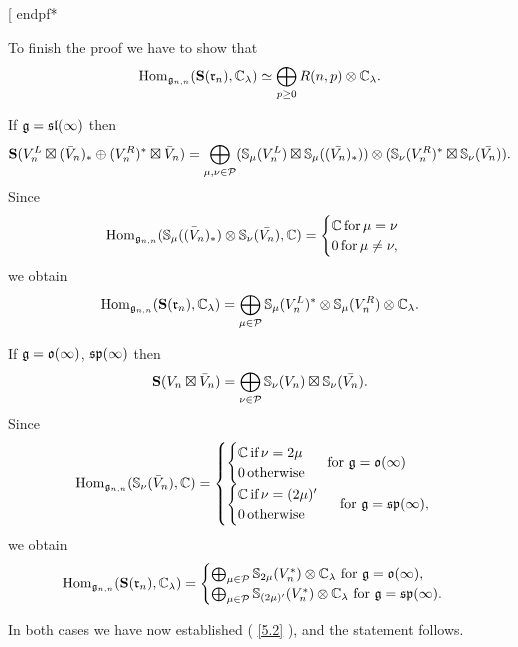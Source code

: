 \documentclass[12pt]{amsart}
\makeatletter
\def\mathbb{\Bbb}
\def\mathfrak{\frak}
\newenvironment{proof}{%
         \@ifnextchar[{%
                       \expandafter\let\expandafter\end@proof
                         \csname endpf*\endcsname
                         \my@proof
                      }{\let\end@proof\endpf\pf}%
        }{\end@proof}
\def\my@proof[#1]{\@nameuse{pf*}{#1}}
\def\mathcal{\cal}
\def\@putname#1#2#3#4{\def\@@ref{#3}\let\old@bf\bf
        \def\bf##1{\old@bf\if?\noexpand##1?{#4}\else##1\fi}%
        #1{#2}%
        \let\bf\old@bf}
\def\@putname#1#2#3#4{\def\@@ref{#3}\let\old@bf\bf    %
        \let\old@reset@font\reset@font                  %
        \def\bf##1{\old@bf\if?\noexpand##1?{#4}\else##1\fi}%
        \def\reset@font##1##2{\old@reset@font##1\if?\noexpand##2?{#4}\else##2\fi}#1{#2}%
        \let\bf\old@bf\let\reset@font\old@reset@font}
\let\my@ref=\ref
\def\ref#1{\@putname\my@ref{#1}{#1}{\tiny\rm\@@ref}}
\theoremstyle{plain} %
\numberwithin{equation}{section}
\theoremstyle{definition}
\theoremstyle{remark}
\theoremstyle{plain} %
\newcommand{\fg}{\mathfrak{g}}
\newcommand{\fr}{\mathfrak{r}}
\makeatother
\begin{document}
\begin{proof}
To finish the proof we have to show that  
\begin{equation}\label{5.2}
\operatorname{Hom}_{\fg_{n,n}}({\bf S}(\fr_n),\mathbb C_\lambda)\simeq  \bigoplus_{p\geq 0} R(n,p)\otimes\mathbb{C}_{\lambda}.\end{equation}

If $\fg=\mathfrak{sl}(\infty)$ then
$${\bf S}(V_n^L\boxtimes (\bar {V}_n)_*\oplus (V_n^R)^*\boxtimes \bar {V}_n)=\bigoplus_{\mu,\nu\in\mathcal{P}}(\mathbb{S}_\mu (V_n^L)\boxtimes\mathbb{S}_\mu((\bar {V_n})_*))\otimes(\mathbb{S}_\nu(V_n^R)^*\boxtimes \mathbb{S}_\nu(\bar {V_n})).$$
Since $$\operatorname{Hom}_{\mathfrak g_{n,n}}(\mathbb{S}_\mu(\bar {(V_n})_*)\otimes  \mathbb{S}_\nu(\bar {V_n}),\mathbb C)=\begin{cases}\mathbb C\,\text{for}\,\mu=\nu\\ 0\,\text{for}\,\mu\neq\nu,\end{cases}$$
we obtain
$$\operatorname{Hom}_{\fg_{n,n}}({\bf S}(\fr_n),\mathbb C_\lambda)=\bigoplus_{\mu \in \mathcal{P}}\mathbb{S}_\mu (V_n^L)^*\otimes \mathbb{S}_\mu(V_n^R)\otimes \mathbb C_\lambda.$$

If $\fg=\mathfrak{o}(\infty)$, $\mathfrak{sp}(\infty)$  then
$${\bf S}(V_n\boxtimes \bar {V}_n)=\bigoplus_{\nu \in \mathcal{P}}\mathbb{S}_\nu(V_n)\boxtimes \mathbb{S}_\nu(\bar {V_n}).$$
Since
$$\operatorname{Hom}_{\mathfrak g_{n,n}}(\mathbb{S}_\nu(\bar {V}_n),\mathbb C)=\begin{cases}\begin{cases}\mathbb C\,\text{if}\,\nu=2\mu\\ 0\,\text{otherwise}\end{cases}\text{ for }\fg=\mathfrak{o}(\infty)\\\begin{cases}\mathbb C\,\text{if}\,\nu=(2\mu)'\\ 0\,\text{otherwise}\end{cases}\text{ for }\fg=\mathfrak{sp}(\infty),\end{cases}$$
we obtain
$$\operatorname{Hom}_{\fg_{n,n}}({\bf S}(\fr_n),\mathbb C_\lambda)=\begin{cases}\bigoplus_{\mu \in \mathcal{P}}\mathbb S_{2\mu}(V_n^*)\otimes\mathbb C_\lambda \text{ for }\fg=\mathfrak{o}(\infty), \\\bigoplus_{\mu \in \mathcal{P}}\mathbb S_{(2\mu)'}(V_n^*)\otimes\mathbb C_\lambda \text{ for }\fg=\mathfrak{sp}(\infty).\end{cases}$$

In both cases we have now established (\ref{5.2}), and the statement follows.
\end{proof}
\end{document}
